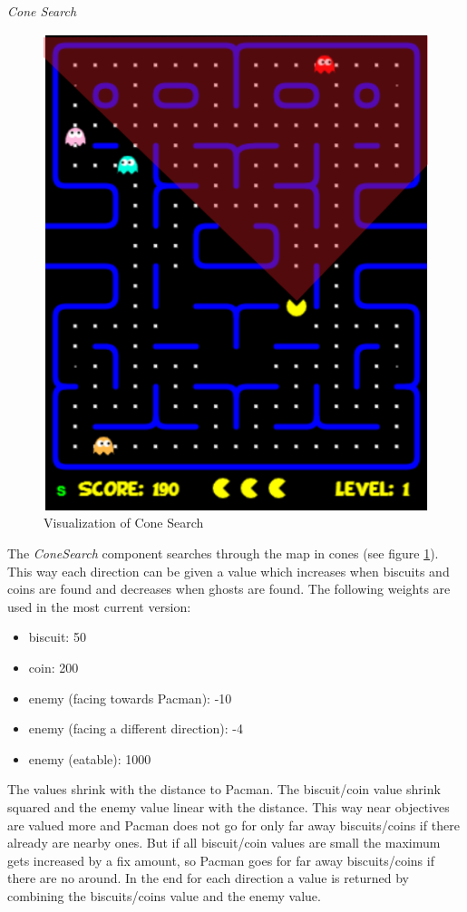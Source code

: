 \emph{Cone Search} \newline
\begin{figure}
	\caption{Visualization of Cone Search}
	\label{fig:cone}
	\centering
	\includegraphics[scale=0.65]{pictures/Pacman/Cone.png}
\end{figure}
The \textit{ConeSearch} component searches through the map in cones (see figure \ref{fig:cone}). This way each direction can be given a value which increases when biscuits and coins are found and decreases when ghosts are found. The following weights are used in the most current version:
\begin{itemize}
	\item biscuit: 50
	\item coin: 200
	\item enemy (facing towards Pacman): -10
	\item enemy (facing a different direction): -4
	\item enemy (eatable): 1000
\end{itemize}
The values shrink with the distance to Pacman. The biscuit/coin value shrink squared and the enemy value linear with the distance. This way near objectives are valued more and Pacman does not go for only far away biscuits/coins if there already are nearby ones. But if all biscuit/coin values are small the maximum gets increased by a fix amount, so Pacman goes for far away biscuits/coins if there are no around. In the end for each direction a value is returned by combining the biscuits/coins value and the enemy value. 
